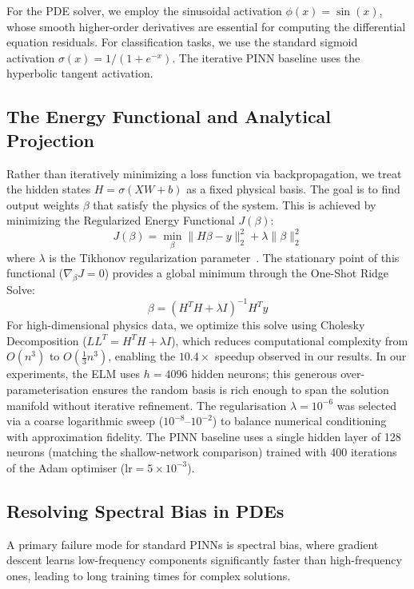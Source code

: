 \documentclass[final,12pt,3p,times,fleqn]{elsarticle}
\begin{document}
For the PDE solver, we employ the sinusoidal activation $\phi(x) = \sin(x)$, whose smooth higher-order derivatives are essential for computing the differential equation residuals. For classification tasks, we use the standard sigmoid activation $\sigma(x) = 1/(1+e^{-x})$. The iterative PINN baseline uses the hyperbolic tangent activation.

\subsection{The Energy Functional and Analytical Projection}

Rather than iteratively minimizing a loss function via backpropagation, we treat the hidden states $H = \sigma(XW + b)$ as a fixed physical basis. The goal is to find output weights $\beta$ that satisfy the physics of the system. This is achieved by minimizing the Regularized Energy Functional $J(\beta)$:
$$J(\beta) = \min_{\beta} \| H\beta - y \|^2_2 + \lambda \|\beta\|^2_2$$
where $\lambda$ is the Tikhonov regularization parameter~\cite{tikhonov1977solutions}. The stationary point of this functional ($\nabla_\beta J = 0$) provides a global minimum through the One-Shot Ridge Solve:
$$\beta = (H^T H + \lambda I)^{-1} H^T y$$
For high-dimensional physics data, we optimize this solve using Cholesky Decomposition ($L L^T = H^T H + \lambda I$), which reduces computational complexity from $O(n^3)$ to $O(\frac{1}{3} n^3)$, enabling the $10.4\times$ speedup observed in our results. In our experiments, the ELM uses $h=4096$ hidden neurons; this generous over-parameterisation ensures the random basis is rich enough to span the solution manifold without iterative refinement. The regularisation $\lambda = 10^{-6}$ was selected via a coarse logarithmic sweep ($10^{-8}$--$10^{-2}$) to balance numerical conditioning with approximation fidelity. The PINN baseline uses a single hidden layer of 128 neurons (matching the shallow-network comparison) trained with 400 iterations of the Adam optimiser ($\text{lr} = 5 \times 10^{-3}$).

\subsection{Resolving Spectral Bias in PDEs}

A primary failure mode for standard PINNs is spectral bias, where gradient descent learns low-frequency components significantly faster than high-frequency ones, leading to long training times for complex solutions.
\end{document}
